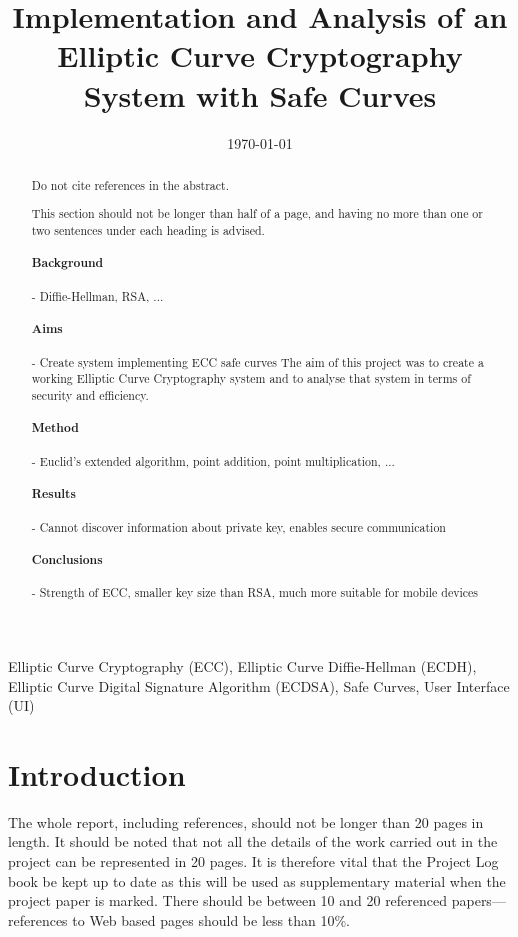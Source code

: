 \documentclass[12pt,a4paper]{article}
\title{Implementation and Analysis of an Elliptic Curve Cryptography System with Safe Curves}
\author{} %
\date{\today}
\begin{document}
\maketitle

\begin{abstract}
Do not cite references in the abstract.

This section should not be longer than half of a page, and having no more than one or two sentences under each heading is advised.

\paragraph{Background} -
Diffie-Hellman, RSA, ...

\paragraph{Aims} -
Create system implementing ECC safe curves
The aim of this project was to create a working Elliptic Curve Cryptography system 
and to analyse that system in terms of security and efficiency. 

\paragraph{Method} -
Euclid's extended algorithm, point addition, point multiplication, ...

\paragraph{Results} -
Cannot discover information about private key, enables secure communication

\paragraph{Conclusions} -
Strength of ECC, smaller key size than RSA, much more suitable for mobile devices

\end{abstract}


\begin{keywords}
Elliptic Curve Cryptography (ECC), Elliptic Curve Diffie-Hellman (ECDH), Elliptic Curve Digital Signature Algorithm (ECDSA), 
Safe Curves, User Interface (UI)
\end{keywords}


\section{Introduction}
The whole report, including references, should not be longer than 20 pages in length.
It should be noted that not all the details of the work carried out in the project can be represented in 20 pages.
It is therefore vital that the Project Log book be kept up to date as this will be used as supplementary material when the project paper is marked.
There should be between 10 and 20 referenced papers---references to Web based pages should be less than 10\%.
\end{document}
